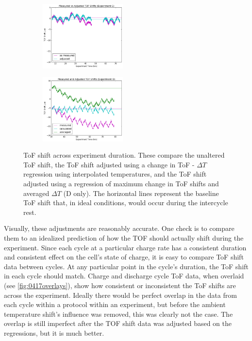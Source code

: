 \begin{figure}[h!]\label{fig:adj}
\centering
     \begin{subfigure}
         \centering
         \includegraphics[width=0.48\textwidth]{Thesis/0409adj.png}
     \end{subfigure}
     \hfill
     \begin{subfigure}
         \centering
         \includegraphics[width=0.48\textwidth]{Thesis/0417adj.png}
     \end{subfigure}
     \caption{ToF shift across experiment duration. These compare the unaltered ToF shift, the ToF shift adjusted using a change in ToF - $\Delta T$ regression using interpolated temperatures, and the ToF shift adjusted using a regression of maximum change in ToF shifts and averaged $\Delta T$ (D only). The horizontal lines represent the baseline ToF shift that, in ideal conditions, would occur during the intercycle rest.}
\end{figure}

Visually, these adjustments are reasonably accurate. 
One check is to compare them to an idealized prediction of how the TOF should actually shift during the experiment. 
Since each cycle at a particular charge rate has a consistent duration and consistent effect on the cell's state of charge, it is easy to compare ToF shift data between cycles. 
At any particular point in the cycle's duration, the ToF shift in each cycle should match. Charge and discharge cycle ToF data, when overlaid (see \hyperref[fig:0417overlays]{\cref{fig:0417overlays}}), show how consistent or inconsistent the ToF shifts are across the experiment.
Ideally there would be perfect overlap in the data from each cycle within a protocol within an experiment, but before the ambient temperature shift's influence was removed, this was clearly not the case. 
The overlap is still imperfect after the TOF shift data was adjusted based on the regressions, but it is much better.

